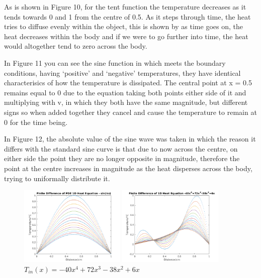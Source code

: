 \documentclass[11pt,a4paper]{article}
\begin{document}
As is shown in Figure 10, for the tent function the temperature decreases as it tends towards 0 and 1 from the centre of 0.5. As it steps through time, the heat tries to diffuse evenly within the object, this is shown by as time goes on, the heat decreases within the body and if we were to go further into time, the heat would altogether tend to zero across the body.

\vspace{3mm}In Figure 11 you can see the sine function in which meets the boundary conditions, having `positive' and `negative' temperatures, they have identical characterisics of how the temperature is dissipated. The central point at x = 0.5 remains equal to 0 due to the equation taking both points either side of it and multiplying with v, in which they both have the same magnitude, but different signs so when added together they cancel and cause the temperature to remain at 0 for the time being.

\vspace{3mm}In Figure 12, the absolute value of the sine wave was taken in which the reason it differs with the standard sine curve is that due to now across the centre, on either side the point they are no longer opposite in magnitude, therefore the point at the centre increases in magnitude as the heat disperses across the body, trying to uniformally distribute it.

\pagebreak

\begin{figure}
	\includegraphics[width=0.45\textwidth]{Ex4_Figs/sinpi.png}
	\vspace{-3mm}
	\caption{$T_{in}(x)= sin(\pi x)$}
	\label{fig:test1}
		\includegraphics[width=0.45\textwidth]{Ex4_Figs/poly.png}
		\vspace{-3mm}
	\caption{$T_{in}(x)= -40x^4 +72x^3 -38x^2 +6x$}
	\label{fig:test2}
\end{figure}
\end{document}
